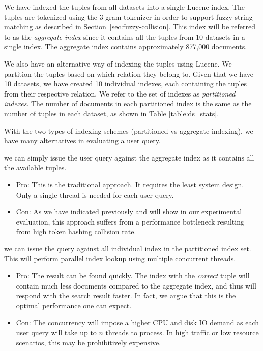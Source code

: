 We have indexed the tuples from all datasets into a single Lucene index.  The tuples are tokenized  using the 3-gram tokenizer in order to support fuzzy string matching as described in Section~\ref{sec:fuzzy-collision}.  This index will be referred to as the {\em aggregate index} since it contains all the tuples from 10 datasets in a single index.  The aggregate index contains approximately 877,000 documents.

We also have an alternative way of indexing the tuples using Lucene.  We partition the tuples based on which relation they belong to.  Given that we have 10 datasets, we have created 10 individual indexes, each containing the tuples from their respective relation.  We refer to the set of indexes as {\em partitioned indexes}.
The number of documents in each partitioned index is the same as the number of tuples in each dataset, as shown in Table \ref{table:ds_stats}.

With the two types of indexing schemes (partitioned vs aggregate indexing), we have many alternatives in evaluating a user query.

 we can simply issue the user query against the aggregate index as it contains all the available tuples.  

\begin{itemize}
    \item Pro: This is the traditional approach. It requires the least system design. Only a single thread is needed for each user query.
    \item Con: As we have indicated previously and will show in our experimental evaluation, this approach suffers from a performance bottleneck resulting from high token hashing collision rate.
\end{itemize}

 we can issue the query against all individual index in the partitioned index set.  This will perform parallel index lookup using multiple concurrent threads.

\begin{itemize}
    \item Pro: The result can be found quickly.  The index with the {\em correct} tuple will contain much less documents compared to the aggregate index, and thus will respond with the search result faster.  In fact, we argue that this is the optimal performance one can expect.
    \item Con: The concurrency will impose a higher CPU and disk IO demand as each user query will take up to $n$ threads to process.  In high traffic or low resource scenarios, this may be prohibitively expensive.
\end{itemize}

